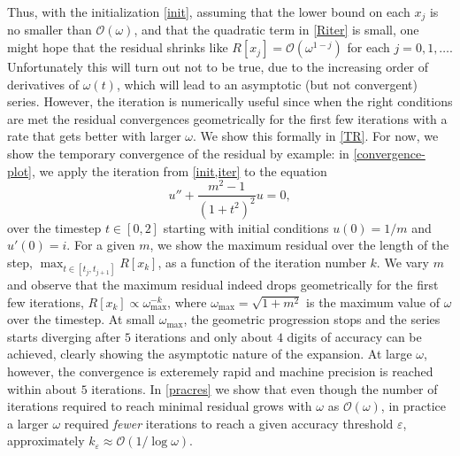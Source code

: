 \documentclass[10pt]{article}
\newcommand{\bigO}{{\mathcal O}}
\newcommand{\om}{\omega}
\begin{document}
Thus, with the initialization \cref{init},
assuming that the lower bound on each $x_j$ is no smaller than $\bigO(\om)$,
and that the quadratic term in \cref{Riter} is small,
one might hope that
the residual shrinks like $R[x_j] = \bigO(\om^{1-j})$ for each $j=0,1,\dots$.
Unfortunately this will turn out not to be true, due to the increasing
order of derivatives of $\om(t)$, which will lead to an
asymptotic (but not convergent) series.
However, the iteration is numerically useful since when the right conditions
are met the residual convergences geometrically for the first few iterations with a
rate that gets better with larger $\om$. We show this formally in \cref{TR}.
%
For now, we show the temporary convergence of the residual by example: in \cref{convergence-plot}, we apply
the iteration from \cref{init,iter} to the equation 
\begin{equation}\label{bursteq}
    u'' + \frac{m^2 - 1}{(1+t^2)^2}u = 0,  
\end{equation}
over the timestep $t \in [0, 2]$ starting with initial conditions $u(0) = 1/m$ and
$u'(0) = i$. For a given $m$, we show the maximum residual over the length of
the step, $\max_{t \in [t_j, t_{j+1}]}R[x_k]$, as a function
of the iteration number $k$. We vary $m$ and observe that the maximum residual
indeed drops geometrically for the first few iterations, $R[x_k] \propto
\om_{\text{max}}^{-k}$, where $\om_{\text{max}} = \sqrt{1 + m^2}$ is the
maximum value of $\om$ over the timestep. At small $\om_{\text{max}}$, the
geometric progression stops and the series starts diverging after $5$
iterations and only about $4$ digits of accuracy can be achieved, clearly
showing the asymptotic nature of the expansion. At large $\om$, however, the
convergence is exteremely rapid and machine precision is reached within about
$5$ iterations. In \cref{pracres} we show that even though the number of iterations
required to reach minimal residual grows with $\om$ as $\bigO(\om)$, in
practice a larger $\om$ required \emph{fewer} iterations to reach a given
accuracy threshold $\varepsilon$, approximately $k_{\varepsilon} \approx
\bigO(1/\log\om)$.  
\end{document}
